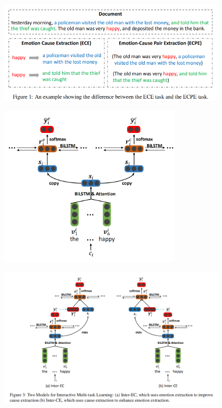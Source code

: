 \documentclass[a4paper,UTF8]{article}
\numberwithin{equation}{section}
\begin{document}
\begin{figure}[H]
	\centering
	\includegraphics[width=\textwidth]{3-1.png}
\end{figure}
\begin{figure}[H]
	\centering
	\includegraphics[width=0.8\textwidth]{3-2.png}
\end{figure}
\begin{figure}[H]
	\centering
	\includegraphics[width=\textwidth]{3-3.png}
\end{figure}
\end{document}

